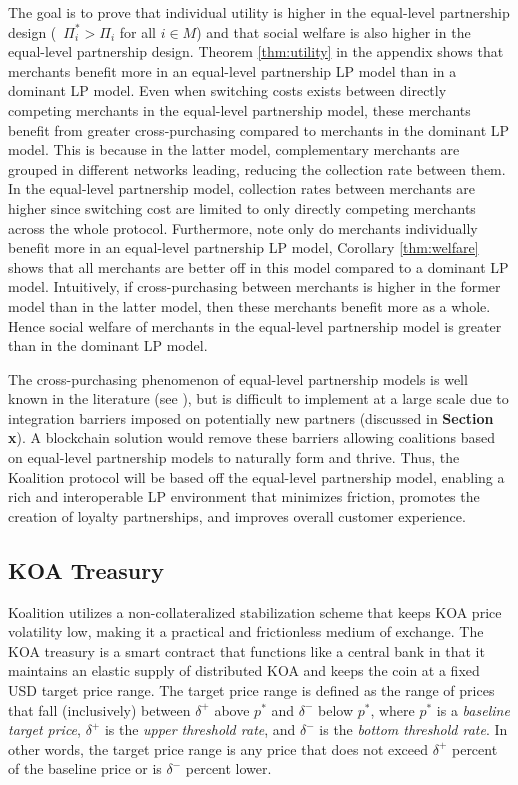 The goal is to prove that individual utility is higher in the equal-level partnership design (\ie\ $\Pi_i^* > \Pi_i$ for all $i \in M$) and that social welfare is also higher in the equal-level partnership design. Theorem \ref{thm:utility} in the appendix shows that merchants benefit more in an equal-level partnership LP model than in a dominant LP model. Even when switching costs exists between directly competing merchants in the equal-level partnership model, these merchants benefit from greater cross-purchasing compared to merchants in the dominant LP model. This is because in the latter model, complementary merchants are grouped in different networks leading, reducing the collection rate between them. In the equal-level partnership model, collection rates between merchants are higher since switching cost are limited to only directly competing merchants across the whole protocol. Furthermore, note only do merchants individually benefit more in an equal-level partnership LP model, Corollary \ref{thm:welfare} shows that all merchants are better off in this model compared to a dominant LP model. Intuitively, if cross-purchasing between merchants is higher in the former model than in the latter model, then these merchants benefit more as a whole. Hence social welfare of merchants in the equal-level partnership model is greater than in the dominant LP model.

The cross-purchasing phenomenon of equal-level partnership models is well known in the literature (see \cite{Dorotic12}), but is difficult to implement at a large scale due to integration barriers imposed on potentially new partners (discussed in \textbf{Section x}). A blockchain solution would remove these barriers allowing coalitions based on equal-level partnership models to naturally form and thrive. Thus, the Koalition protocol will be based off the equal-level partnership model, enabling a rich and interoperable LP environment that minimizes friction, promotes the creation of loyalty partnerships, and improves overall customer experience. 

\subsection{KOA Treasury}
Koalition utilizes a non-collateralized stabilization scheme that keeps KOA price volatility low, making it a practical and frictionless medium of exchange. The KOA treasury is a smart contract that functions like a central bank in that it maintains an elastic supply of distributed KOA and keeps the coin at a fixed USD target price range. The target price range is defined as the range of prices that fall (inclusively) between $\delta^+$ above $p^*$ and $\delta^-$ below $p^*$, where $p^*$ is a \textit{baseline target price}, $\delta^+$ is the \textit{upper threshold rate}, and $\delta^-$ is the \textit{bottom threshold rate}. In other words, the target price range is any price that does not exceed $\delta^+$ percent of the baseline price or is $\delta^-$ percent lower.

